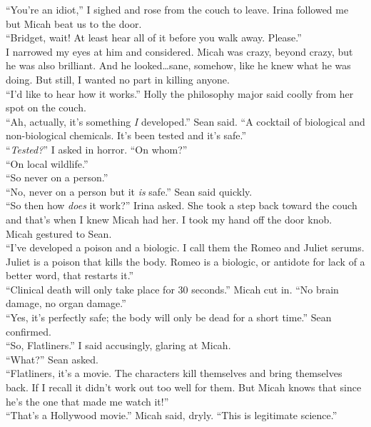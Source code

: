\documentclass[a5paper]{scrartcl}
\begin{document}
\enquote{You're an idiot,} I sighed and rose from the couch to leave. Irina followed me but Micah beat us to the door.\\
\enquote{Bridget, wait! At least hear all of it before you walk away. Please.}\\
I narrowed my eyes at him and considered. Micah was crazy, beyond crazy, but he was also brilliant. And he looked\dots sane, somehow, like he knew what he was doing. But still, I wanted no part in killing anyone.\\
\enquote{I'd like to hear how it works.} Holly the philosophy major said coolly from her spot on the couch.\\
\enquote{Ah, actually, it's something \textit{I} developed.} Sean said. \enquote{A cocktail of biological and non-biological chemicals. It's been tested and it's safe.}\\
\enquote{\textit{Tested?}} I asked in horror. \enquote{On whom?}\\
\enquote{On local wildlife.}\\
\enquote{So never on a person.}\\
\enquote{No, never on a person but it \textit{is} safe.} Sean said quickly.\\
\enquote{So then how \textit{does} it work?} Irina asked. She took a step back toward the couch and that's when I knew Micah had her. I took my hand off the door knob.\\
Micah gestured to Sean.\\
\enquote{I've developed a poison and a biologic. I call them the Romeo and Juliet serums. Juliet is a poison that kills the body. Romeo is a biologic, or antidote for lack of a better word, that restarts it.}\\
\enquote{Clinical death will only take place for 30 seconds.” Micah cut in. “No brain damage, no organ damage.}\\
“Yes, it's perfectly safe; the body will only be dead for a short time.” Sean confirmed.\\
\enquote{So, Flatliners.} I said accusingly, glaring at Micah.\\
\enquote{What?} Sean asked.\\
\enquote{Flatliners, it's a movie. The characters kill themselves and bring themselves back. If I recall it didn't work out too well for them. But Micah knows that since he's the one that made me watch it!}\\
\enquote{That's a Hollywood movie.} Micah said, dryly. \enquote{This is legitimate science.}\\
\end{document}
